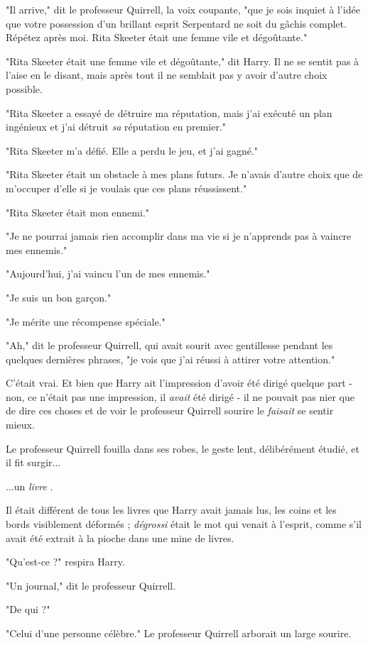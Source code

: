 "Il arrive," dit le professeur Quirrell, la voix coupante, "que je sois inquiet à l'idée que votre possession d'un brillant esprit Serpentard ne soit du gâchis complet. Répétez après moi. Rita Skeeter était une femme vile et dégoûtante."

"Rita Skeeter était une femme vile et dégoûtante," dit Harry. Il ne se sentit pas à l'aise en le disant, mais après tout il ne semblait pas y avoir d'autre choix possible.

"Rita Skeeter a essayé de détruire ma réputation, mais j'ai exécuté un plan ingénieux et j'ai détruit \emph{sa}  réputation en premier."

"Rita Skeeter m'a défié. Elle a perdu le jeu, et j'ai gagné."

"Rita Skeeter était un obstacle à mes plans futurs. Je n'avais d'autre choix que de m'occuper d'elle si je voulais que ces plans réussissent."

"Rita Skeeter était mon ennemi."

"Je ne pourrai jamais rien accomplir dans ma vie si je n'apprends pas à vaincre mes ennemis."

"Aujourd'hui, j'ai vaincu l'un de mes ennemis."

"Je suis un bon garçon."

"Je mérite une récompense spéciale."

"Ah," dit le professeur Quirrell, qui avait sourit avec gentillesse pendant les quelques dernières phrases, "je vois que j'ai réussi à attirer votre attention."

C'était vrai. Et bien que Harry ait l'impression d'avoir été dirigé quelque part - non, ce n'était pas une impression, il \emph{avait}  été dirigé - il ne pouvait pas nier que de dire ces choses et de voir le professeur Quirrell sourire le \emph{faisait}  se sentir mieux.

Le professeur Quirrell fouilla dans ses robes, le geste lent, délibérément étudié, et il fit surgir...

...un \emph{livre} .

Il était différent de tous les livres que Harry avait jamais lus, les coins et les bords visiblement déformés ; \emph{dégrossi}  était le mot qui venait à l'esprit, comme s'il avait été extrait à la pioche dans une mine de livres.

"Qu'est-ce ?" respira Harry.

"Un journal," dit le professeur Quirrell.

"De qui ?"

"Celui d'une personne célèbre." Le professeur Quirrell arborait un large sourire.


